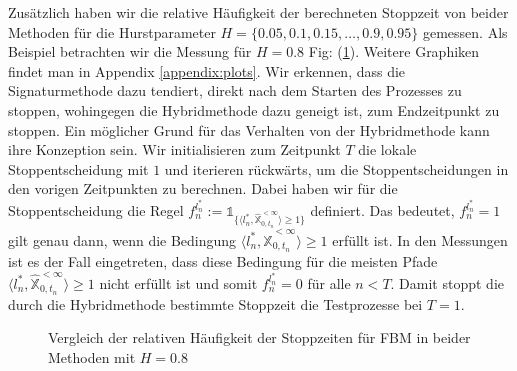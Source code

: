 \documentclass[12pt,titlepage,headsepline]{article}
\begin{document}
        \hfill\break
        Zusätzlich haben wir die relative Häufigkeit der berechneten Stoppzeit von beider Methoden für die Hurstparameter $H = \{0.05,0.1,0.15,\ldots,0.9,0.95\}$ gemessen. Als Beispiel betrachten wir die Messung für $H=0.8$ Fig: (\ref{verteilung_vergleich_0_8}). Weitere Graphiken findet man in Appendix \ref{appendix:plots}.
        \hfill\break
        Wir erkennen, dass die Signaturmethode dazu tendiert, direkt nach dem Starten des Prozesses zu stoppen, wohingegen die Hybridmethode dazu geneigt ist, zum Endzeitpunkt zu stoppen. Ein möglicher Grund für das Verhalten von der Hybridmethode kann ihre Konzeption sein. Wir initialisieren zum Zeitpunkt $T$ die lokale Stoppentscheidung mit $1$ und iterieren rückwärts, um die Stoppentscheidungen in den vorigen Zeitpunkten zu berechnen. Dabei haben wir für die Stoppentscheidung die Regel
        $f_n^{l_n^*} := \mathds{1}_{ \{ \langle l_n^*, \hat{\mathbb{X}}^{< \infty}_{0,t_n}  \rangle \geq 1 \} }$ definiert. Das bedeutet, $f_n^{l_n^*}=1$ gilt genau dann, wenn die Bedingung $\langle l_n^*, \hat{\mathbb{X}}^{< \infty}_{0,t_n}  \rangle \geq 1$ erfüllt ist. In den Messungen ist es der Fall eingetreten, dass diese Bedingung für die meisten Pfade
        $\langle l_n^*, \hat{\mathbb{X}}^{< \infty}_{0,t_n}  \rangle \geq 1$ nicht erfüllt ist und somit $f_n^{l_n^*}=0$ für alle $n<T$. Damit stoppt die durch die Hybridmethode bestimmte Stoppzeit die Testprozesse bei $T=1$.
        \begin{figure}[H]
          \caption{Vergleich der relativen Häufigkeit der Stoppzeiten für FBM in beider Methoden mit $H=0.8$}
          \label{verteilung_vergleich_0_8}
        \end{figure}
\end{document}

